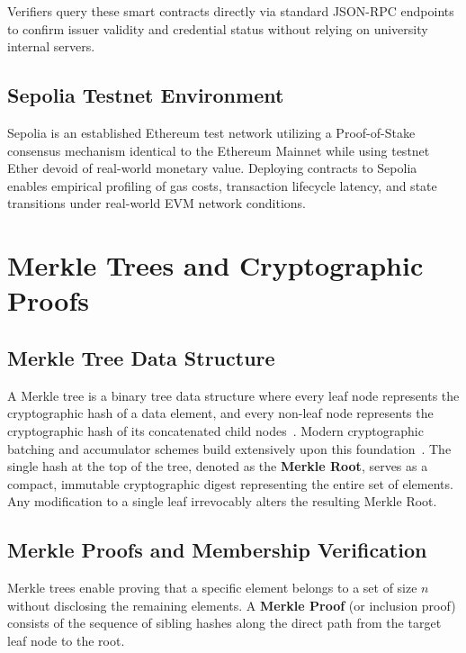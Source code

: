 Verifiers query these smart contracts directly via standard JSON-RPC endpoints to confirm issuer validity and credential status without relying on university internal servers.

\subsection{Sepolia Testnet Environment}

Sepolia is an established Ethereum test network utilizing a Proof-of-Stake consensus mechanism identical to the Ethereum Mainnet while using testnet Ether devoid of real-world monetary value. Deploying contracts to Sepolia enables empirical profiling of gas costs, transaction lifecycle latency, and state transitions under real-world EVM network conditions.

\section{Merkle Trees and Cryptographic Proofs}

\subsection{Merkle Tree Data Structure}

A Merkle tree is a binary tree data structure where every leaf node represents the cryptographic hash of a data element, and every non-leaf node represents the cryptographic hash of its concatenated child nodes~\cite{Merkle1988DigitalSignature,Narayanan2016BitcoinBook}. Modern cryptographic batching and accumulator schemes build extensively upon this foundation~\cite{Boneh2019BatchingAccumulators}. The single hash at the top of the tree, denoted as the \textbf{Merkle Root}, serves as a compact, immutable cryptographic digest representing the entire set of elements. Any modification to a single leaf irrevocably alters the resulting Merkle Root.

\subsection{Merkle Proofs and Membership Verification}

Merkle trees enable proving that a specific element belongs to a set of size $n$ without disclosing the remaining elements. A \textbf{Merkle Proof} (or inclusion proof) consists of the sequence of sibling hashes along the direct path from the target leaf node to the root.

